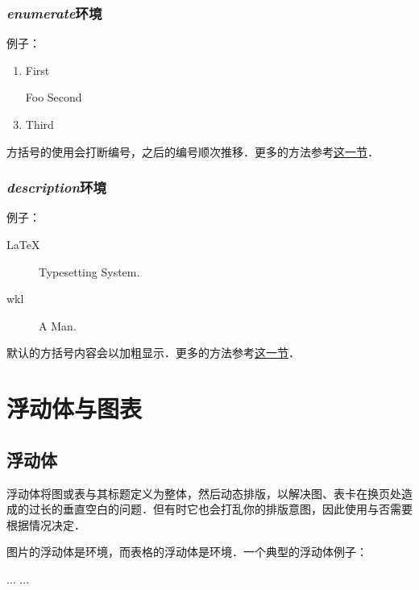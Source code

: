 \subsubsection{\textit{enumerate}环境}
例子：

\begin{codeshow}
\begin{enumerate}
  \item First
  \item[Foo] Second
  \item Third
\end{enumerate}
\end{codeshow}

方括号的使用会打断编号，之后的编号顺次推移．更多的方法参考\hyperref[sec:list]{这一节}．

\subsubsection{\textit{description}环境}
例子：

\begin{codeshow}
\begin{description}
  \item[LaTeX] Typesetting System.
  \item[wkl] A Man.
\end{description}
\end{codeshow}

默认的方括号内容会以加粗显示．更多的方法参考\hyperref[sec:list]{这一节}．

\section{浮动体与图表}
\label{sec:float}

\subsection{浮动体}
浮动体将图或表与其标题定义为整体，然后动态排版，以解决图、表卡在换页处造成的过长的垂直空白的问题．但有时它也会打乱你的排版意图，因此使用与否需要根据情况决定．

图片的浮动体是环境，而表格的浮动体是环境．一个典型的浮动体例子：
\begin{latex}
\begin{table}[!htb]
    \centering
    \caption{table-cap}
    \label{table-name}
    \begin{tabular}{...}
        ...
    \end{tabular}
\end{table}
\end{latex}

